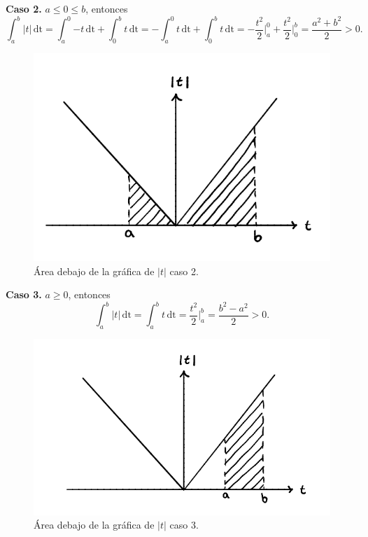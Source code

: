 \documentclass{article}
\numberwithin{equation}{section}
\begin{document}
\textbf{Caso 2.} $a\leq 0\leq b$, entonces
$$\int_{a}^{b} \! {|t|} \, \mathrm{dt}=\int_{a}^{0} \! {-t} \, \mathrm{dt}+\int_{0}^{b} \! {t} \, \mathrm{dt}=-\int_{a}^{0} \! {t} \, \mathrm{dt}+\int_{0}^{b} \! {t} \, \mathrm{dt}=-\frac{t^2}{2}\Big|_a^0+\frac{t^2}{2}\Big|_0^b=\frac{a^2+b^2}{2}>0.$$

\begin{figure}[h]
    \centering
    \includegraphics[scale=0.3]{images/fig4.png}
    \caption{Área debajo de la gráfica de $|t|$ caso 2.}
    \label{fig:fig4}
\end{figure}

\textbf{Caso 3.} $a\geq 0$, entonces 
$$\int_{a}^{b} \! {|t|} \, \mathrm{dt}=\int_{a}^{b} \! {t} \, \mathrm{dt}=\frac{t^2}{2}\Big|_a^b=\frac{b^2-a^2}{2}>0.$$

\begin{figure}[h]
    \centering
    \includegraphics[scale=0.3]{images/fig5.png}
    \caption{Área debajo de la gráfica de $|t|$ caso 3.}
    \label{fig:fig5}
\end{figure}
\end{document}
